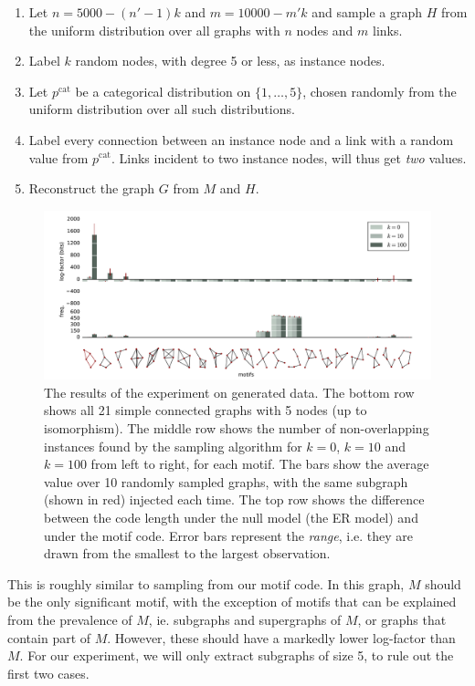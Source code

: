 \documentclass[twoside,11pt]{article}
\begin{document}
\begin{enumerate}
  \item Let $n = 5000 - (n'-1)k$ and $m = 10000 - m'k$ and sample a graph $H$ from the uniform distribution over all graphs with $n$ nodes and $m$ links.   
  \item Label $k$ random nodes, with degree 5 or less, as instance nodes.
  \item Let $p^\text{cat}$ be a categorical distribution on $\{1, \ldots, 5\}$, chosen randomly from the uniform distribution over all such distributions.
  \item Label every connection between an instance node and a link with a random value from $p^\text{cat}$. Links incident to two instance nodes, will thus get \emph{two} values.
  \item Reconstruct the graph $G$ from $M$ and $H$.
\end{enumerate}


\begin{figure}[tb]
  \hspace{-0.1\textwidth}
  \includegraphics[width=1.2\textwidth]{./images/synthetic-plot.pdf}
  \caption{\small The results of the experiment on generated data. The bottom row shows all 21 simple connected graphs with 5 nodes (up to isomorphism). The middle row shows the number of non-overlapping instances found by the sampling algorithm for $k = 0$, $k=10$ and $k=100$ from left to right, for each motif. The bars show the average value over 10 randomly sampled graphs, with the same subgraph (shown in red) injected each time. The top row shows the difference between  the code length under the null model (the ER model) and under the motif code. Error bars represent the \emph{range}, i.e. they are drawn from the smallest to the largest observation.}
  \label{figure:plot-synthetic}
\end{figure}

This is roughly similar to sampling from our motif code. In this graph, $M$ should be the only significant motif, with the exception of motifs that can be explained from the prevalence of $M$, ie. subgraphs and supergraphs of $M$, or graphs that contain part of $M$. However, these should have a markedly lower log-factor than $M$. For our experiment, we will only extract subgraphs of size 5, to rule out the first two cases.
\end{document}
